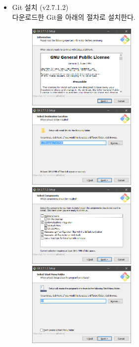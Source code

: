 \documentclass[11pt
  , a4paper
  , article
  , oneside
]{memoir}
\begin{document}
\begin{itemize}
	\item Git 설치 (v2.7.1.2)\\
	다운로드한 Git을 아래의 절차로 설치한다.
	\begin{figure}[!htb]
		\centering
		\subbottom 
		{
			\includegraphics[width=0.5\textwidth]{./images/gitinstall2.PNG}%
			\includegraphics[width=0.5\textwidth]{./images/gitinstall3.PNG}
		}
		\subbottom
		{
			\includegraphics[width=0.5\textwidth]{./images/gitinstall4.PNG}%
			\includegraphics[width=0.5\textwidth]{./images/gitinstall5.PNG}   
}
\end{figure}
\end{itemize}
\end{document}
